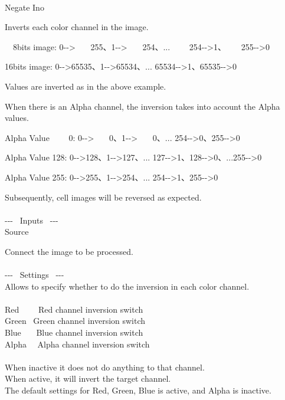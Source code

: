 \documentclass[a4paper,12pt]{article}
\begin{document}
\thispagestyle{empty}

\Large
\noindent \\
Negate Ino\medskip
\par
\normalsize
Inverts each color channel in the image.\\
\par
\ \ 8bits image: 0-{-}> \ \ \ 255、1-{-}> \ \ \, 254、... \ \ \ \ 254-{-}>1、 \ \ \, 255-{-}>0\par
16bits image: 0-{-}>65535、1-{-}>65534、... 65534-{-}>1、65535-{-}>0\par
Values are inverted as in the above example.\\
\par
When there is an Alpha channel, the inversion takes into account the Alpha values.\par
Alpha Value \ \ \ \ 0: 0-{-}> \ \ \, 0、1-{-}> \ \ \ 0、... 254-{-}>0、255-{-}>0\par
Alpha Value 128: 0-{-}>128、1-{-}>127、... 127-{-}>1、128-{-}>0、...255-{-}>0\par
Alpha Value 255: 0-{-}>255、1-{-}>254、... 254-{-}>1、255-{-}>0\par
Subsequently, cell images will be reversed as expected.\\
\\
-{-}- \ Inputs \ -{-}-\\
Source\par
Connect the image to be processed.\\
\\
-{-}- \ Settings \ -{-}-\\
Allows to specify whether to do the inversion in each color channel.\\
\\
Red \ \ \ \, Red channel inversion switch\\
Green \ Green channel inversion switch\\
Blue \ \ \, Blue channel inversion switch\\
Alpha \ \ Alpha channel inversion switch\\
\\
When inactive it does not do anything to that channel.\\
When active, it will invert the target channel.\\
The default settings for Red, Green, Blue is active, and Alpha is inactive.
\end{document}
